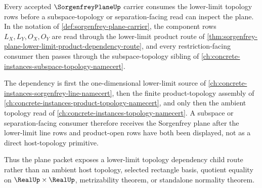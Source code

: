 \begin{theorem}
\label{thm:sorgenfrey-plane-lower-limit-topology-dependency}
Every accepted $\SorgenfreyPlaneUp$ carrier consumes the lower-limit topology rows before a subspace-topology or separation-facing read can inspect the plane. In the notation of \autoref{def:sorgenfrey-plane-carrier}, the component rows $L_X,L_Y,O_X,O_Y$ are read through the lower-limit product route of \autoref{thm:sorgenfrey-plane-lower-limit-product-dependency-route}, and every restriction-facing consumer then passes through the subspace-topology sibling of \autoref{ch:concrete-instances-subspace-topology-namecert}.

The dependency is first the one-dimensional lower-limit source of \autoref{ch:concrete-instances-sorgenfrey-line-namecert}, then the finite product-topology assembly of \autoref{ch:concrete-instances-product-topology-namecert}, and only then the ambient topology read of \autoref{ch:concrete-instances-topology-namecert}. A subspace or separation-facing consumer therefore receives the Sorgenfrey plane after the lower-limit line rows and product-open rows have both been displayed, not as a direct host-topology primitive.

Thus the plane packet exposes a lower-limit topology dependency child route rather than an ambient host topology, selected rectangle basis, quotient equality on $\RealUp\times\RealUp$, metrizability theorem, or standalone normality theorem.
\end{theorem}
